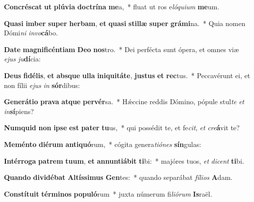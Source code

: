 \item \textbf{Con}\textbf{crés}\textbf{cat} \textbf{ut} \textbf{plú}\textbf{vi}\textbf{a} \textbf{doc}\textbf{trí}\textbf{na} \textbf{me}a,~* fluat ut ros e\textit{ló}\textit{qui}\textit{um} \textbf{me}um.
\item \textbf{Qua}\textbf{si} \textbf{im}\textbf{ber} \textbf{su}\textbf{per} \textbf{her}\textbf{bam}, \textbf{et} \textbf{qua}\textbf{si} \textbf{stil}\textbf{læ} \textbf{su}\textbf{per} \textbf{grá}\textbf{mi}na.~* Quia nomen Dómi\textit{ni} \textit{in}\textit{vo}\textbf{cá}bo.
\item \textbf{Da}\textbf{te} \textbf{ma}\textbf{gni}\textbf{fi}\textbf{cén}\textbf{ti}\textbf{am} \textbf{De}\textbf{o} \textbf{nos}tro.~* Dei perfécta sunt ópera, et omnes viæ \textit{e}\textit{jus} \textit{ju}\textbf{dí}cia:
\item \textbf{De}\textbf{us} \textbf{fi}\textbf{dé}\textbf{lis}, \textbf{et} \textbf{abs}\textbf{que} \textbf{ul}\textbf{la} \textbf{in}\textbf{i}\textbf{qui}\textbf{tá}\textbf{te}, \textbf{jus}\textbf{tus} \textbf{et} \textbf{rec}tus.~* Peccavérunt ei, et non fílii \textit{e}\textit{jus} \textit{in} \textbf{sór}dibus:
\item \textbf{Ge}\textbf{ne}\textbf{rá}\textbf{ti}\textbf{o} \textbf{pra}\textbf{va} \textbf{at}\textbf{que} \textbf{per}\textbf{vér}sa.~* Hǽccine reddis Dómino, pópule stul\textit{te} \textit{et} \textit{in}\textbf{sí}piens?
\item \textbf{Num}\textbf{quid} \textbf{non} \textbf{ip}\textbf{se} \textbf{est} \textbf{pa}\textbf{ter} \textbf{tu}us,~* qui possédit te, et fe\textit{cit}, \textit{et} \textit{cre}\textbf{á}vit te?
\item \textbf{Me}\textbf{mén}\textbf{to} \textbf{di}\textbf{é}\textbf{rum} \textbf{an}\textbf{ti}\textbf{quó}rum,~* cógita genera\textit{ti}\textit{ó}\textit{nes} \textbf{sín}gulas:
\item \textbf{In}\textbf{tér}\textbf{ro}\textbf{ga} \textbf{pa}\textbf{trem} \textbf{tu}\textbf{um}, \textbf{et} \textbf{an}\textbf{nun}\textbf{ti}\textbf{á}\textbf{bit} \textbf{ti}bi:~* majóres tuos, \textit{et} \textit{di}\textit{cent} \textbf{ti}bi.
\item \textbf{Quan}\textbf{do} \textbf{di}\textbf{vi}\textbf{dé}\textbf{bat} \textbf{Al}\textbf{tís}\textbf{si}\textbf{mus} \textbf{Gen}tes:~* quando separábat \textit{fí}\textit{li}\textit{os} \textbf{A}dam.
\item \textbf{Con}\textbf{stí}\textbf{tu}\textbf{it} \textbf{tér}\textbf{mi}\textbf{nos} \textbf{po}\textbf{pu}\textbf{ló}rum~* juxta númerum fi\textit{li}\textit{ó}\textit{rum} \textbf{Is}raël.

